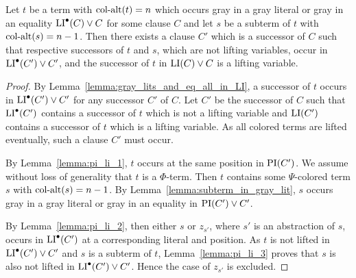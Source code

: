 \documentclass[%
	draft=false,%
	numbers=noendperiod,%
	11pt,%
	a4paper,%
	oneside,%
	openany,%
]{memoir}
\begin{document}
\cbstart
\begin{lemma}
	\label{lemma:subterm_of_multicol_term}
	Let $t$ be a term with $\operatorname{col-alt}(t)=n$ which occurs gray in a gray literal or gray in an equality $\operatorname{LI}^\bullet(C) \lor C$ for some clause $C$ and let $s$ be a subterm of $t$ with $\operatorname{col-alt}(s) = n-1$.
	Then there exists a clause $C'$ which is a successor of $C$ such that respective successors of $t$ and $s$, which are not lifting variables, occur in $\operatorname{LI}^\bullet(C') \lor C'$, and the successor of $t$ in $\operatorname{LI}(C) \lor C$ is a lifting variable.
\end{lemma}
\begin{proof}
	By Lemma~\ref{lemma:gray_lits_and_eq_all_in_LI}, a successor of $t$ occurs in $\operatorname{LI}^\bullet(C') \lor C'$ for any successor $C'$ of $C$.
	Let $C'$ be the successor of $C$ such that $\operatorname{LI}^\bullet(C')$ contains a successor of $t$ which is not a lifting variable and $\operatorname{LI}(C')$ contains a successor of $t$ which is a lifting variable.
	As all colored terms are lifted eventually, such a clause $C'$ must occur.

	By Lemma~\ref{lemma:pi_li_1}, $t$ occurs at the same position in $\operatorname{PI}(C')$.
	We assume without loss of generality that $t$ is a $\Phi$-term.
	Then $t$ contains some $\Psi$-colored term $s$ with $\operatorname{col-alt}(s) = n-1$.
	By Lemma~\ref{lemma:subterm_in_gray_lit}, $s$ occurs gray in a gray literal or gray in an equality in $\operatorname{PI}(C')\lor C'$.

	By Lemma~\ref{lemma:pi_li_2}, then either $s$ or $z_{s'}$, where $s'$ is an abstraction of $s$, occurs in $\operatorname{LI}^\bullet(C')$ at a corresponding literal and position. 
	As $t$ is not lifted in $\operatorname{LI}^\bullet(C') \lor C'$ and $s$ is a subterm of $t$, Lemma~\ref{lemma:pi_li_3} proves that $s$ is also not lifted in $\operatorname{LI}^\bullet(C') \lor C'$. Hence the case of $z_{s'}$ is excluded.
\end{proof}
\end{document}
